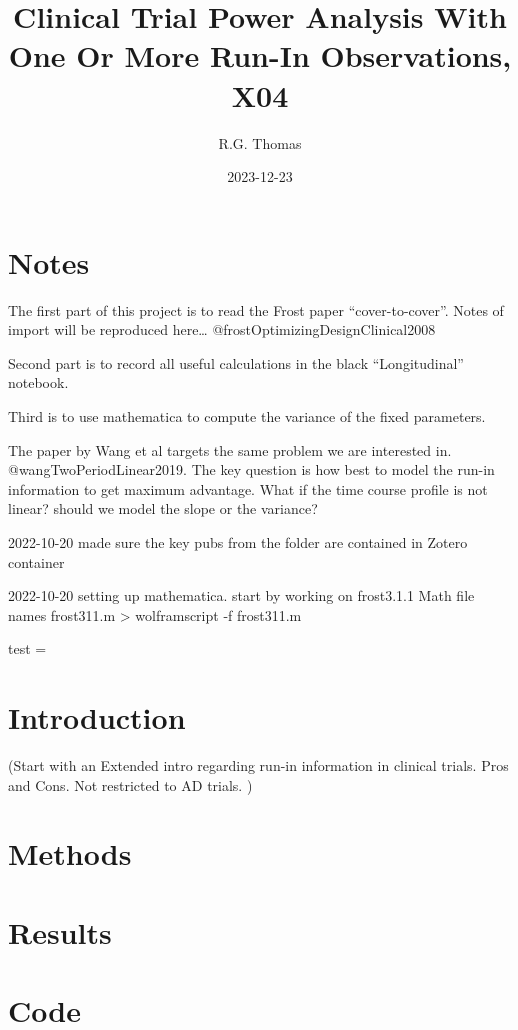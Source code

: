 \documentclass[
  11pt,
]{article}
\title{Clinical Trial Power Analysis With One Or More Run-In
Observations, X04}
\author{R.G. Thomas}
\date{2023-12-23}
\begin{document}
\maketitle

{
\setcounter{tocdepth}{2}
\tableofcontents
}
\section{Notes}\label{notes}

The first part of this project is to read the Frost paper
``cover-to-cover''. Notes of import will be reproduced here\ldots{}
@frostOptimizingDesignClinical2008

Second part is to record all useful calculations in the black
``Longitudinal'' notebook.

Third is to use mathematica to compute the variance of the fixed
parameters.

The paper by Wang et al targets the same problem we are interested in.
@wangTwoPeriodLinear2019. The key question is how best to model the
run-in information to get maximum advantage. What if the time course
profile is not linear? should we model the slope or the variance?

2022-10-20 made sure the key pubs from the folder are contained in
Zotero container

2022-10-20 setting up mathematica. start by working on frost3.1.1 Math
file names frost311.m \textgreater{} wolframscript -f frost311.m

test = \cite{frostAnalysisRepeatedDirect2004}
\cite{frisonLinearlyDivergentTreatment1997}

\section{Introduction}\label{introduction}

(Start with an Extended intro regarding run-in information in clinical
trials. Pros and Cons. Not restricted to AD trials. )

\section{Methods}\label{methods}

\section{Results}\label{results}

\section{Code}\label{code}




\nocite{*}
\end{document}
